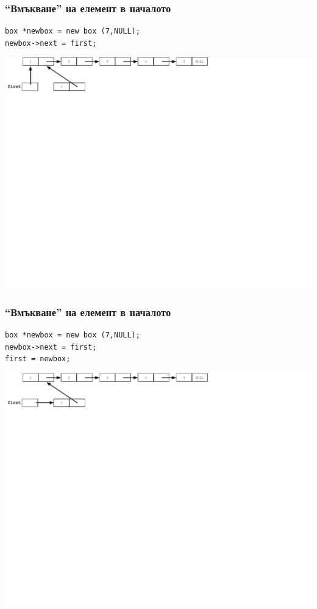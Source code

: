 \documentclass{beamer}
\begin{document}
\begin{frame}[fragile]
\frametitle{``Вмъкване'' на елемент в началото}

\begin{flushleft}
\begin{lstlisting}
box *newbox = new box (7,NULL);
newbox->next = first;
\end{lstlisting}  
\end{flushleft}


\includegraphics[width=14.0cm]{images/03_ll_push_firstlink.pdf}

\end{frame}



\begin{frame}[fragile]
\frametitle{``Вмъкване'' на елемент в началото}

\begin{flushleft}
\begin{lstlisting}
box *newbox = new box (7,NULL);
newbox->next = first;
first = newbox;
\end{lstlisting}  
\end{flushleft}


\includegraphics[width=14.0cm]{images/03_ll_push_secondtlink.pdf}

\end{frame}
\end{document}
